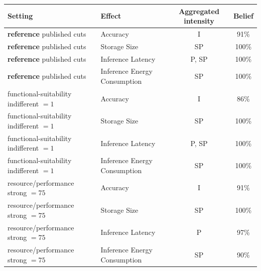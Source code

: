 \begin{tabular}{llcc}
\toprule
Setting & Effect & Aggregated intensity & Belief \\
\midrule
\textbf{reference} published cuts & Accuracy & I & 91\% \\
\textbf{reference} published cuts & Storage Size & SP & 100\% \\
\textbf{reference} published cuts & Inference Latency & {P, SP} & 100\% \\
\textbf{reference} published cuts & Inference Energy Consumption & SP & 100\% \\
functional-suitability indifferent $=1$ & Accuracy & I & 86\% \\
functional-suitability indifferent $=1$ & Storage Size & SP & 100\% \\
functional-suitability indifferent $=1$ & Inference Latency & {P, SP} & 100\% \\
functional-suitability indifferent $=1$ & Inference Energy Consumption & SP & 100\% \\
resource/performance strong $=75$ & Accuracy & I & 91\% \\
resource/performance strong $=75$ & Storage Size & SP & 100\% \\
resource/performance strong $=75$ & Inference Latency & P & 97\% \\
resource/performance strong $=75$ & Inference Energy Consumption & SP & 90\% \\
\bottomrule
\end{tabular}
